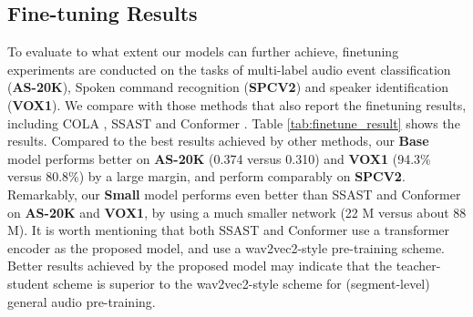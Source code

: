 \subsection{Fine-tuning Results}
To evaluate to what extent our models can further achieve, finetuning  experiments are conducted on the tasks of multi-label audio event classification (\textbf{AS-20K}), Spoken command recognition (\textbf{SPCV2}) and speaker identification (\textbf{VOX1}). We compare with those methods that also report the finetuning results, including  COLA \cite{saeed_contrastive_2020}, SSAST \cite{srivastava_conformer-based_2022} and Conformer \cite{srivastava_conformer-based_2022}. 
Table \ref{tab:finetune_result} shows the results. Compared to the best results achieved by other methods, our \textbf{Base} model performs better on  \textbf{AS-20K} (0.374 versus 0.310) and \textbf{VOX1} (94.3\% versus 80.8\%) by a large margin, and perform comparably on \textbf{SPCV2}. Remarkably, our \textbf{Small} model performs even better than SSAST and Conformer on \textbf{AS-20K} and \textbf{VOX1}, by using a much smaller network (22 M versus about 88 M). It is worth mentioning that both SSAST and Conformer use a transformer encoder as the proposed model, and use a wav2vec2-style pre-training scheme. Better results achieved by the proposed model may indicate that the teacher-student scheme is superior to the wav2vec2-style scheme for (segment-level) general audio pre-training.  

